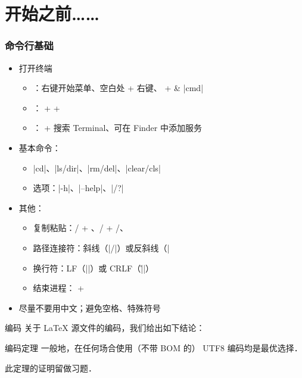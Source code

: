 \section{开始之前……}

\begin{frame}[fragile]
\frametitle{命令行基础}
\begin{itemize}
  \item 打开终端

    \begin{itemize}
      \item \faWindows{}：右键开始菜单、空白处  + 右键、 +  \& |cmd|
      \item \faLinux{}： +  + 
      \item \faApple{}： +  搜索 Terminal、可在 Finder 中添加服务
    \end{itemize}

  \item 基本命令：

    \begin{itemize}
      \item |cd|、|ls/dir|、|rm/del|、|clear/cls|
      \item 选项：|-h|、|--help|、|/?|
    \end{itemize}

  \item 其他：

    \begin{itemize}
      \item 复制粘贴：/ + 、/ + /、
      \item 路径连接符：斜线（|/|）或反斜线（|\|）
      \item 换行符：LF（|\n|）或 CRLF（|\r\n|）
      \item 结束进程： + 
    \end{itemize} \pause

  \item \alert{尽量不要用中文；避免空格、特殊符号}
\end{itemize}
\end{frame}

\begin{frame}{编码}
关于 \LaTeX{} 源文件的编码，我们给出如下结论：\pause
\begin{alertblock}{编码定理}
  \vspace{0cm}
  一般地，在任何场合使用（不带 BOM 的） \alert{UTF\CASE{-}8} 编码均是最优选择．
\end{alertblock} \pause
此定理的证明留做习题．
\end{frame}
